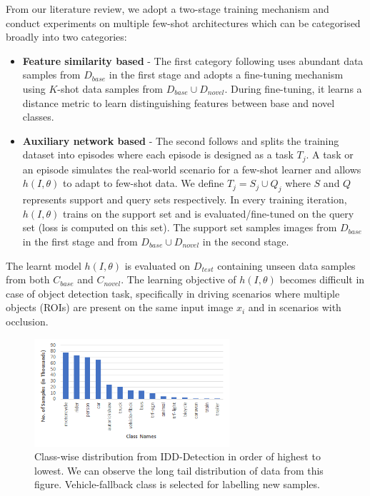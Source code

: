 \documentclass[letterpaper]{article} %
\begin{document}
From our literature review, we adopt a two-stage training mechanism and conduct experiments on multiple few-shot architectures which can be categorised broadly into two categories:
\begin{itemize}
      \item \textbf{Feature similarity based} - The first category following \cite{fsdet} uses abundant data samples from $D_{base}$ in the first stage and adopts a fine-tuning mechanism using $K$-shot data samples from $D_{base} \cup D_{novel}$. During fine-tuning, it learns a distance metric to learn distinguishing features between base and novel classes.
      \item \textbf{Auxiliary network based} - The second follows \cite{reweight,addfeat,metarcnn} and splits the training dataset into episodes where each episode is designed as a task $T_{j}$. A task or an episode simulates the real-world scenario for a few-shot learner and allows $h(I,\theta)$ to adapt to few-shot data. We define $T_{j} = S_{j} \cup Q_{j}$ where $S$ and $Q$ represents support and query sets respectively. In every training iteration, $h(I,\theta)$ trains on the support set and is evaluated/fine-tuned on the query set (loss is computed on this set). The support set samples images from $D_{base}$ in the first stage and from $D_{base} \cup D_{novel}$ in the second stage.
\end{itemize}

The learnt model $h(I,\theta)$ is evaluated on $D_{test}$ containing unseen data samples from both $C_{base}$ and $C_{novel}$. The learning objective of $h(I,\theta)$ becomes difficult in case of object detection task, specifically in driving scenarios where multiple objects (ROIs) are present on the same input image $x_{i}$ and in scenarios with occlusion.

\begin{figure}[t]
\centering
\includegraphics[width=0.9\columnwidth,height=4cm]{idd_distribution}
\caption{Class-wise distribution from IDD-Detection in order of highest to lowest. We can observe the long tail distribution of data from this figure. Vehicle-fallback class is selected for labelling new samples.}
\label{fig_dist}
\end{figure}
\end{document}
